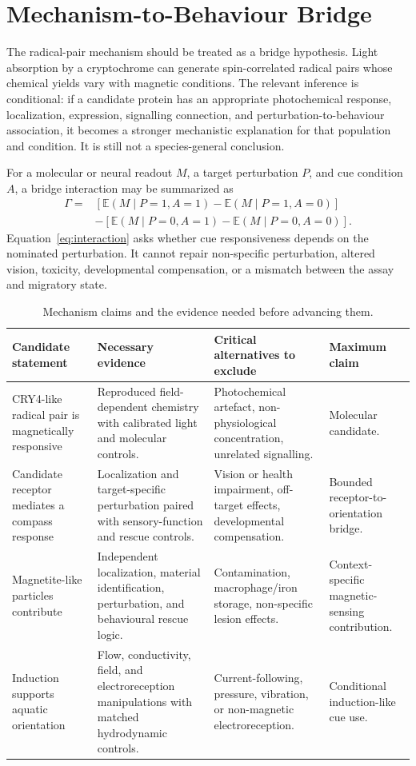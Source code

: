 \documentclass[conference]{IEEEtran}
\begin{document}
\section{Mechanism-to-Behaviour Bridge}\label{sec:mechanism}
The radical-pair mechanism should be treated as a bridge hypothesis. Light absorption by a cryptochrome can generate spin-correlated radical pairs whose chemical yields vary with magnetic conditions. The relevant inference is conditional: if a candidate protein has an appropriate photochemical response, localization, expression, signalling connection, and perturbation-to-behaviour association, it becomes a stronger mechanistic explanation for that population and condition. It is still not a species-general conclusion.

For a molecular or neural readout $M$, a target perturbation $P$, and cue condition $A$, a bridge interaction may be summarized as
\begin{align}
\Gamma={}&\left[\mathbb{E}(M\mid P=1,A=1)-\mathbb{E}(M\mid P=1,A=0)\right]\nonumber\\
&-\left[\mathbb{E}(M\mid P=0,A=1)-\mathbb{E}(M\mid P=0,A=0)\right].
\label{eq:interaction}
\end{align}
Equation~\eqref{eq:interaction} asks whether cue responsiveness depends on the nominated perturbation. It cannot repair non-specific perturbation, altered vision, toxicity, developmental compensation, or a mismatch between the assay and migratory state.

\begin{table}[!t]
\caption{Mechanism claims and the evidence needed before advancing them.}\label{tab:mechanism}\centering\footnotesize
\begin{tabular}{@{}L{.20\textwidth}L{.24\textwidth}L{.28\textwidth}L{.20\textwidth}@{}}\toprule
Candidate statement & Necessary evidence & Critical alternatives to exclude & Maximum claim\\\midrule
CRY4-like radical pair is magnetically responsive & Reproduced field-dependent chemistry with calibrated light and molecular controls. & Photochemical artefact, non-physiological concentration, unrelated signalling. & Molecular candidate.\\
Candidate receptor mediates a compass response & Localization and target-specific perturbation paired with sensory-function and rescue controls. & Vision or health impairment, off-target effects, developmental compensation. & Bounded receptor-to-orientation bridge.\\
Magnetite-like particles contribute & Independent localization, material identification, perturbation, and behavioural rescue logic. & Contamination, macrophage/iron storage, non-specific lesion effects. & Context-specific magnetic-sensing contribution.\\
Induction supports aquatic orientation & Flow, conductivity, field, and electroreception manipulations with matched hydrodynamic controls. & Current-following, pressure, vibration, or non-magnetic electroreception. & Conditional induction-like cue use.\\\bottomrule
\end{tabular}
\end{table}
\end{document}
